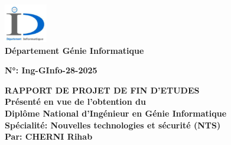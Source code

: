 \begin{titlepage}
\begin{table}[H]
\begin{tabular}{ccc}
    \end{tabular}
\end{table}
\vspace{-1.4cm}
\makebox[1.12\textwidth]{\textcolor{red}\hrulefill}
 \\ \vspace{0.2cm}
\noindent
\parbox{0.4\textwidth}{
    \centering
    \includegraphics[width=0.14\textwidth]{pages/page-de-garde/img/logo-d.PNG} \\
    \fontsize{10}{9}\selectfont
    \textbf{Département Génie Informatique}
}
\hfill 
\parbox{0.7\textwidth}{
    \vspace{-1.5cm}
    \raggedleft
    \textbf{\small N°: Ing-GInfo-28-2025}
}
\vspace{0.1cm}
\begin{adjustwidth}{1.6cm}{0cm}
 \begin{center}
        \textbf{\Large RAPPORT DE PROJET DE FIN D’ETUDES}\\
        \vspace{0.5cm}
        \textbf{\small \fontsize{12}{6}\selectfont Présenté en vue de l’obtention du}\\
        \vspace{0.2cm}
        \textbf{\small \fontsize{12}{6}\selectfont Diplôme National d’Ingénieur en Génie Informatique}\\
        \vspace{0.2cm}
        \textbf{\small \fontsize{12}{6}\selectfont Spécialité: Nouvelles technologies et sécurité (NTS)}\\
        \vspace{0.5cm}
        \textbf{\small \fontsize{12}{6}\selectfont Par: CHERNI Rihab } \\
        \vspace{-0.6cm}
        \begin{adjustwidth}{-1cm}{0cm}
            \begin{center}
                \setlength{\fboxsep}{10pt} 
                \setlength{\fboxrule}{4pt} 
\end{center}
\end{adjustwidth}
\end{center}
\end{adjustwidth}
\end{titlepage}
